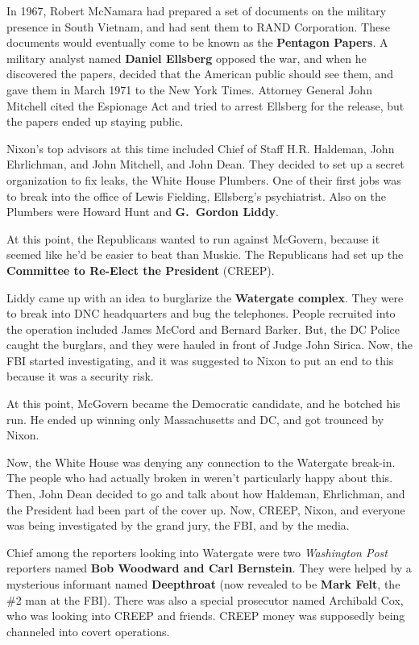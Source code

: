 In 1967, Robert McNamara had prepared a set of documents on the military presence in South Vietnam,
and had sent them to RAND Corporation.
These documents would eventually come to be known as the \textbf{Pentagon Papers}.
A military analyst named \textbf{Daniel Ellsberg} opposed the war,
and when he discovered the papers, decided that the American public should see them,
and gave them in March 1971 to the New York Times.
Attorney General John Mitchell cited the Espionage Act and tried to arrest Ellsberg for the release,
but the papers ended up staying public.

Nixon's top advisors at this time included Chief of Staff H.R. Haldeman,
John Ehrlichman, and John Mitchell, and John Dean.
They decided to set up a secret organization to fix leaks, the White House Plumbers.
One of their first jobs was to break into the office of Lewis Fielding, Ellsberg's psychiatrist.
Also on the Plumbers were Howard Hunt and \textbf{G.\ Gordon Liddy}.

At this point, the Republicans wanted to run against McGovern,
because it seemed like he'd be easier to beat than Muskie.
The Republicans had set up the \textbf{Committee to Re-Elect the President} (CREEP).

Liddy came up with an idea to burglarize the \textbf{Watergate complex}.
They were to break into DNC headquarters and bug the telephones.
People recruited into the operation included James McCord and Bernard Barker.
But, the DC Police caught the burglars, and they were hauled in front of Judge John Sirica.
Now, the FBI started investigating,
and it was suggested to Nixon to put an end to this because it was a security risk.

At this point, McGovern became the Democratic candidate, and he botched his run.
He ended up winning only Massachusetts and DC, and got trounced by Nixon.

Now, the White House was denying any connection to the Watergate break-in.
The people who had actually broken in weren't particularly happy about this.
Then, John Dean decided to go and talk about how Haldeman, Ehrlichman,
and the President had been part of the cover up.
Now, CREEP, Nixon, and everyone was being investigated by the grand jury, the FBI, and by the media.

Chief among the reporters looking into Watergate were two \textit{Washington Post} reporters
named \textbf{Bob Woodward and Carl Bernstein}.
They were helped by a mysterious informant named \textbf{Deepthroat}
(now revealed to be \textbf{Mark Felt}, the \#2 man at the FBI).
There was also a special prosecutor named Archibald Cox, who was looking into CREEP and friends.
CREEP money was supposedly being channeled into covert operations.

